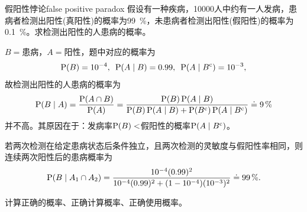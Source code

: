 \begin{example}{假阳性悖论}{false positive paradox}
	假设有一种疾病，10000人中约有一人发病，患病者检测出阳性(真阳性)的概率为\qty{99}{\percent}，未患病者检测出阳性(假阳性)的概率为\qty{0.1}{\percent}。求检测出阳性的人患病的概率。

	$B =$患病，$A =$阳性，题中对应的概率为
	\[
		\P(B) = 10^{-4},\enspace
		\P(A \mid B) = 0.99,\enspace
		\P(A \mid B\eventcomp) = 10^{-3},
	\]
	故检测出阳性的人患病的概率为
	\[
		\P(B \mid A) = \frac{\P(A \cap B)}{\P(A)} = \frac{\P(B)\P(A \mid B)}{\P(B)\P(A \mid B) + \P(B\eventcomp)\P(A \mid B\eventcomp)} \doteq \qty{9}{\percent}
	\]
	并不高。其原因在于：发病率$\P(B) <$假阳性的概率$\P(A \mid B\eventcomp)$。

	若两次检测在给定患病状态后条件独立，且两次检测的灵敏度与假阳性率相同，则连续两次阳性后的患病概率为
	\[
		\P(B \mid A_1 \cap A_2)
		= \frac{10^{-4}(0.99)^2}{10^{-4}(0.99)^2 + (1 - 10^{-4})(10^{-3})^2}
		\doteq \qty{99}{\percent}.
	\]
\end{example}

\begin{remark}
	计算正确的概率、正确计算概率、正确使用概率。
\end{remark}
